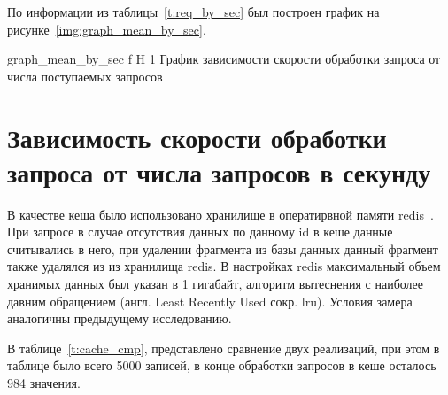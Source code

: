 По информации из таблицы~\ref{t:req_by_sec} был построен график на рисунке~\ref{img:graph_mean_by_sec}.

{graph_mean_by_sec} %
{f} %
{H} %
{1\textwidth} %
{График зависимости скорости обработки запроса от числа поступаемых запросов} %


\section{Зависимость скорости обработки запроса от числа запросов в секунду}
В качестве кеша было использовано хранилище в оператирвной памяти redis~\cite{redis}. При запросе в случае отсутствия данных по данному id в кеше данные считывались в него, при удалении фрагмента из базы данных данный фрагмент также удалялся из из хранилища redis. В настройках redis максимальный объем хранимых данных был указан в 1 гигабайт, алгоритм вытеснения с наиболее давним обращением (англ. Least Recently Used сокр. lru). Условия замера аналогичны предыдущему исследованию.


В таблице~\ref{t:cache_cmp}, представлено сравнение двух реализаций, при этом в таблице было всего 5000 записей, в конце обработки запросов в кеше осталось 984 значения.

